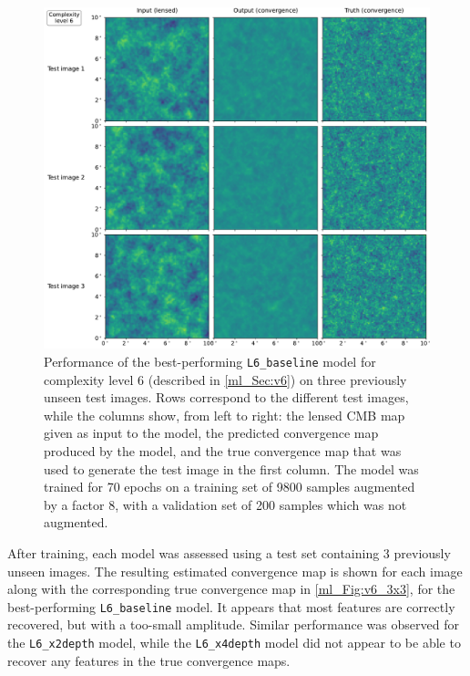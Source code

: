 \begin{figure}[tp]
\includegraphics[width=\textwidth]{v6_3x3}
\caption{Performance of the best-performing \texttt{L6\_baseline} model for complexity level 6 (described in \autoref{ml_Sec:v6}) on three previously unseen test images. Rows correspond to the different test images, while the columns show, from left to right: the lensed CMB map given as input to the model, the predicted convergence map produced by the model, and the true convergence map that was used to generate the test image in the first column. The model was trained for 70 epochs on a training set of 9800 samples augmented by a factor 8, with a validation set of 200 samples which was not augmented.}
\label{ml_Fig:v6_3x3}
\end{figure}

After training, each model was assessed using a test set containing 3 previously unseen images. The resulting estimated convergence map is shown for each image along with the corresponding true convergence map in \autoref{ml_Fig:v6_3x3}, for the best-performing \texttt{L6\_baseline} model. It appears that most features are correctly recovered, but with a too-small amplitude. Similar performance was observed for the \texttt{L6\_x2depth}  model, while the \texttt{L6\_x4depth} model did not appear to be able to recover any features in the true convergence maps.


